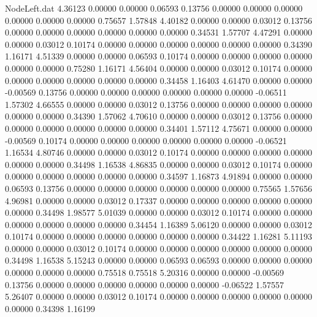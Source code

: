 \begin{filecontents}{NodeLeft.dat}
   4.36123    0.00000    0.00000     0.06593    0.13756    0.00000    0.00000    0.00000    0.00000    0.00000    0.00000    0.75657    1.57848
   4.40182    0.00000    0.00000     0.03012    0.13756    0.00000    0.00000    0.00000    0.00000    0.00000    0.00000    0.34531    1.57707
   4.47291    0.00000    0.00000     0.03012    0.10174    0.00000    0.00000    0.00000    0.00000    0.00000    0.00000    0.34390    1.16171
   4.51339    0.00000    0.00000     0.06593    0.10174    0.00000    0.00000    0.00000    0.00000    0.00000    0.00000    0.75280    1.16171
   4.56404    0.00000    0.00000     0.03012    0.10174    0.00000    0.00000    0.00000    0.00000    0.00000    0.00000    0.34458    1.16403
   4.61470    0.00000    0.00000    -0.00569    0.13756    0.00000    0.00000    0.00000    0.00000    0.00000    0.00000   -0.06511    1.57302
   4.66555    0.00000    0.00000     0.03012    0.13756    0.00000    0.00000    0.00000    0.00000    0.00000    0.00000    0.34390    1.57062
   4.70610    0.00000    0.00000     0.03012    0.13756    0.00000    0.00000    0.00000    0.00000    0.00000    0.00000    0.34401    1.57112
   4.75671    0.00000    0.00000    -0.00569    0.10174    0.00000    0.00000    0.00000    0.00000    0.00000    0.00000   -0.06521    1.16534
   4.80746    0.00000    0.00000     0.03012    0.10174    0.00000    0.00000    0.00000    0.00000    0.00000    0.00000    0.34498    1.16538
   4.86835    0.00000    0.00000     0.03012    0.10174    0.00000    0.00000    0.00000    0.00000    0.00000    0.00000    0.34597    1.16873
   4.91894    0.00000    0.00000     0.06593    0.13756    0.00000    0.00000    0.00000    0.00000    0.00000    0.00000    0.75565    1.57656
   4.96981    0.00000    0.00000     0.03012    0.17337    0.00000    0.00000    0.00000    0.00000    0.00000    0.00000    0.34498    1.98577
   5.01039    0.00000    0.00000     0.03012    0.10174    0.00000    0.00000    0.00000    0.00000    0.00000    0.00000    0.34454    1.16389
   5.06120    0.00000    0.00000     0.03012    0.10174    0.00000    0.00000    0.00000    0.00000    0.00000    0.00000    0.34422    1.16281
   5.11193    0.00000    0.00000     0.03012    0.10174    0.00000    0.00000    0.00000    0.00000    0.00000    0.00000    0.34498    1.16538
   5.15243    0.00000    0.00000     0.06593    0.06593    0.00000    0.00000    0.00000    0.00000    0.00000    0.00000    0.75518    0.75518
   5.20316    0.00000    0.00000    -0.00569    0.13756    0.00000    0.00000    0.00000    0.00000    0.00000    0.00000   -0.06522    1.57557
   5.26407    0.00000    0.00000     0.03012    0.10174    0.00000    0.00000    0.00000    0.00000    0.00000    0.00000    0.34398    1.16199

\end{filecontents}
